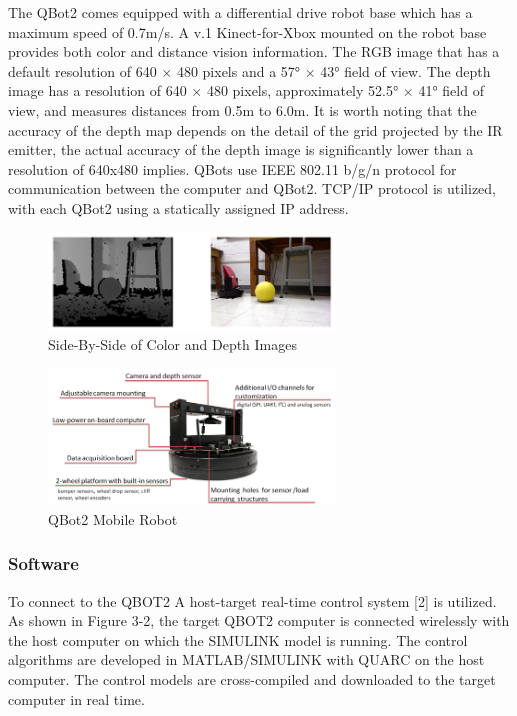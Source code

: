 \documentclass[conference]{IEEEtran}
\begin{document}
The QBot2 comes equipped with a differential drive robot base which has a maximum speed of 0.7m/s. A v.1 Kinect-for-Xbox mounted on the robot base provides both color and distance vision information.  The RGB image that has a default resolution of 640 $\times$ 480 pixels and a 57° $\times$ 43° field of view.  The depth image has a resolution of 640 $\times$ 480 pixels, approximately 52.5° $\times$ 41° field of view, and measures distances from 0.5m to 6.0m. It is worth noting that the accuracy of the depth map depends on the detail of the grid projected by the IR emitter, the actual accuracy of the depth image is significantly lower than a resolution of 640x480 implies.   QBots use IEEE 802.11 b/g/n protocol for communication between the computer and QBot2. TCP/IP protocol is utilized, with each QBot2 using a statically assigned IP address. 
\begin{figure}[htbp] %
     \centering
     \includegraphics[width=3in]{1.png} 
     \caption{Side-By-Side of Color and Depth Images}
     \label{fig:1}
  \end{figure}     


\begin{figure}[htbp] %
     \centering
     \includegraphics[width=3in]{2.png} 
     \caption{QBot2 Mobile Robot}
     \label{fig:2}
  \end{figure}     


\subsubsection{Software}
To connect to the QBOT2 A host-target real-time control system [2] is utilized.   As shown in Figure 3-2, the target QBOT2 computer is connected wirelessly with the host computer on which the SIMULINK model is running. The control algorithms are developed in MATLAB/SIMULINK with QUARC on the host computer. The control models are cross-compiled and downloaded to the target computer in real time. 
\end{document}
